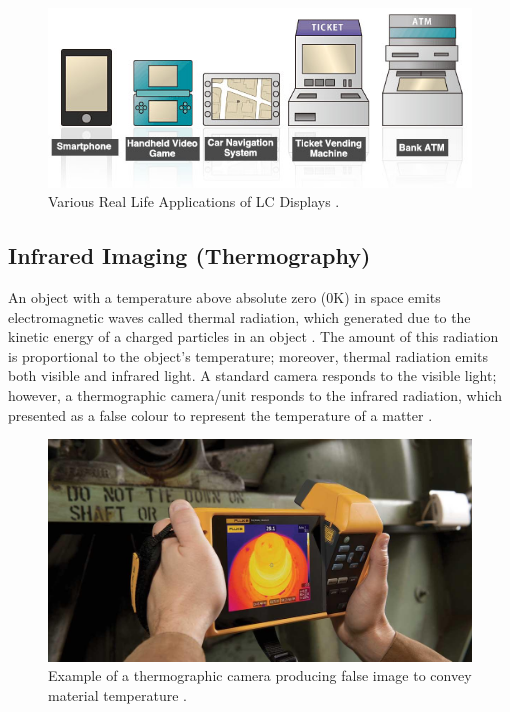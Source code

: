 \begin{figure}[!ht]
    \centering
    \includegraphics[scale = 0.6]{Figures/LCD_various app.jpg}
    \caption{Various Real Life Applications of LC Displays \cite{AnonymousHowEIZO}.}
    \label{fig:LCD var app}
\end{figure}

\subsection{Infrared Imaging (Thermography)}

An object with a temperature above absolute zero (0K) in space emits electromagnetic waves called thermal radiation, which generated due to the kinetic energy of a charged particles in an object \cite{Stumper2015ThermalAviation}. The amount of this radiation is proportional to the object's temperature; moreover, thermal radiation emits both visible and infrared light. A standard camera responds to the visible light; however, a thermographic camera/unit responds to the infrared radiation, which presented as a false colour to represent the temperature of a matter \cite{AnonymousThermographyEngineering}. \\

\begin{figure}[!ht]
    \centering
    \includegraphics[scale=0.3]{Figures/IR_example_false image.jpeg}
    \caption{Example of a thermographic camera producing false image to convey material temperature \cite{TroutInfraredPlant}.}
    \label{fig:basic IR}
\end{figure}

